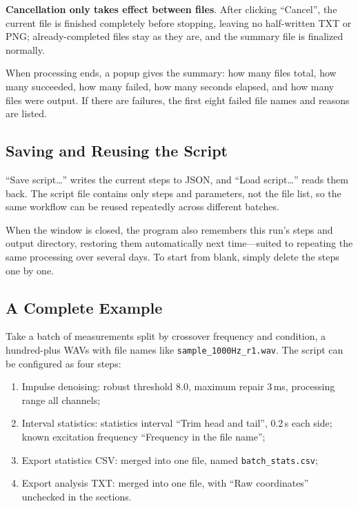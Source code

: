 \documentclass[UTF8,a4paper,12pt]{ctexart}
\begin{document}
\textbf{Cancellation only takes effect between files}. After clicking ``Cancel'', the current file is finished completely before stopping, leaving no half-written TXT or PNG; already-completed files stay as they are, and the summary file is finalized normally.

When processing ends, a popup gives the summary: how many files total, how many succeeded, how many failed, how many seconds elapsed, and how many files were output. If there are failures, the first eight failed file names and reasons are listed.

\subsection{Saving and Reusing the Script}

``Save script\dots'' writes the current steps to JSON, and ``Load script\dots'' reads them back. The script file contains only steps and parameters, not the file list, so the same workflow can be reused repeatedly across different batches.

When the window is closed, the program also remembers this run's steps and output directory, restoring them automatically next time---suited to repeating the same processing over several days. To start from blank, simply delete the steps one by one.

\subsection{A Complete Example}

Take a batch of measurements split by crossover frequency and condition, a hundred-plus WAVs with file names like \texttt{sample\_\allowbreak 1000Hz\_\allowbreak r1.wav}. The script can be configured as four steps:

\begin{enumerate}
  \item Impulse denoising: robust threshold 8.0, maximum repair 3\,ms, processing range all channels;
  \item Interval statistics: statistics interval ``Trim head and tail'', 0.2\,s each side; known excitation frequency ``Frequency in the file name'';
  \item Export statistics CSV: merged into one file, named \texttt{batch\_stats.csv};
  \item Export analysis TXT: merged into one file, with ``Raw coordinates'' unchecked in the sections.
\end{enumerate}
\end{document}
